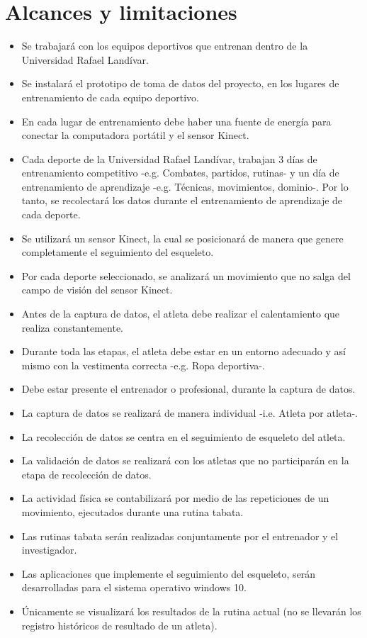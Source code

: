 \section{Alcances y limitaciones}
\begin{itemize}
\item Se trabajar\'a con los equipos deportivos que entrenan dentro de la Universidad Rafael Land\'ivar.
\item Se instalar\'a el prototipo de toma de datos del proyecto, en los lugares de entrenamiento de cada equipo deportivo.
\item En cada lugar de entrenamiento debe haber una fuente de energ\'ia para conectar la computadora port\'atil y el sensor Kinect.
\item Cada deporte de la Universidad Rafael Land\'ivar, trabajan  3 d\'ias de entrenamiento competitivo -e.g. Combates, partidos, rutinas- y un d\'ia de entrenamiento de aprendizaje -e.g. T\'ecnicas, movimientos, dominio-. Por lo tanto, se recolectar\'a los datos durante el entrenamiento de aprendizaje de cada deporte.
\item Se utilizar\'a un sensor Kinect, la cual se posicionar\'a de manera que genere completamente el seguimiento del esqueleto.
\item Por cada deporte seleccionado, se analizar\'a un movimiento que no salga del campo de visi\'on del sensor Kinect.
\item Antes de la captura de datos, el atleta debe realizar el calentamiento que realiza constantemente.
\item Durante toda las etapas, el atleta debe estar en un entorno adecuado y as\'i mismo con la vestimenta correcta -e.g. Ropa deportiva-.
\item Debe estar presente el entrenador o profesional, durante la captura de datos.
\item  La captura de datos se realizar\'a de manera individual -i.e. Atleta por atleta-.
\item  La recolecci\'on de datos se centra en el seguimiento de esqueleto del atleta.
\item La validaci\'on de datos se realizar\'a con los atletas que no participar\'an en la etapa de recolecci\'on de datos.
\item La actividad f\'isica se contabilizar\'a por medio de las repeticiones de un  movimiento, ejecutados durante una rutina tabata.
\item Las rutinas tabata ser\'an realizadas conjuntamente por el entrenador y el investigador.
\item Las aplicaciones que implemente el seguimiento del esqueleto, ser\'an desarrolladas para el sistema operativo windows 10.
\item \'Unicamente se visualizar\'a los resultados de la rutina actual (no se llevar\'an los registro hist\'oricos de resultado de un atleta).
\end{itemize}